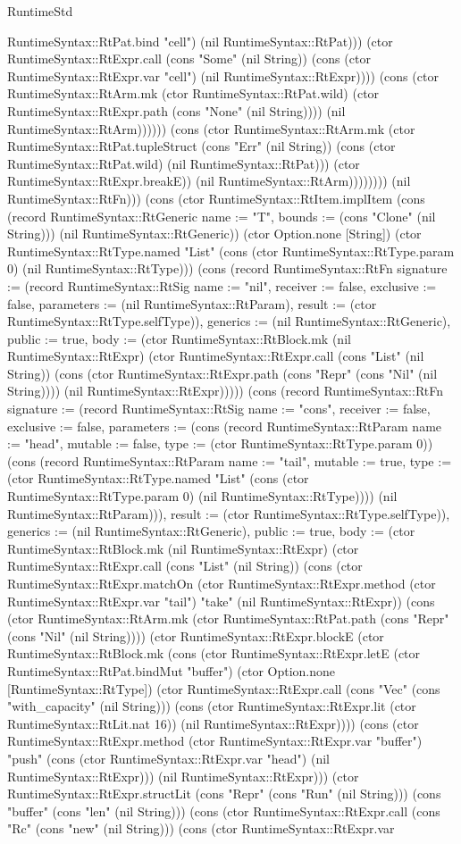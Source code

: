 \begin{lexlean}{RuntimeStd}
\begin{semanticmodule}
{RuntimeSyntax::RtPat.bind "cell") (nil RuntimeSyntax::RtPat))) (ctor RuntimeSyntax::RtExpr.call (cons "Some" (nil String)) (cons (ctor RuntimeSyntax::RtExpr.var "cell") (nil RuntimeSyntax::RtExpr)))) (cons (ctor RuntimeSyntax::RtArm.mk (ctor RuntimeSyntax::RtPat.wild) (ctor RuntimeSyntax::RtExpr.path (cons "None" (nil String)))) (nil RuntimeSyntax::RtArm)))))) (cons (ctor RuntimeSyntax::RtArm.mk (ctor RuntimeSyntax::RtPat.tupleStruct (cons "Err" (nil String)) (cons (ctor RuntimeSyntax::RtPat.wild) (nil RuntimeSyntax::RtPat))) (ctor RuntimeSyntax::RtExpr.breakE)) (nil RuntimeSyntax::RtArm)))))))}) (nil RuntimeSyntax::RtFn))) (cons (ctor RuntimeSyntax::RtItem.implItem (cons (record RuntimeSyntax::RtGeneric {name := "T", bounds := (cons "Clone" (nil String))}) (nil RuntimeSyntax::RtGeneric)) (ctor Option.none [String]) (ctor RuntimeSyntax::RtType.named "List" (cons (ctor RuntimeSyntax::RtType.param 0) (nil RuntimeSyntax::RtType))) (cons (record RuntimeSyntax::RtFn {signature := (record RuntimeSyntax::RtSig {name := "nil", receiver := false, exclusive := false, parameters := (nil RuntimeSyntax::RtParam), result := (ctor RuntimeSyntax::RtType.selfType)}), generics := (nil RuntimeSyntax::RtGeneric), public := true, body := (ctor RuntimeSyntax::RtBlock.mk (nil RuntimeSyntax::RtExpr) (ctor RuntimeSyntax::RtExpr.call (cons "List" (nil String)) (cons (ctor RuntimeSyntax::RtExpr.path (cons "Repr" (cons "Nil" (nil String)))) (nil RuntimeSyntax::RtExpr))))}) (cons (record RuntimeSyntax::RtFn {signature := (record RuntimeSyntax::RtSig {name := "cons", receiver := false, exclusive := false, parameters := (cons (record RuntimeSyntax::RtParam {name := "head", mutable := false, type := (ctor RuntimeSyntax::RtType.param 0)}) (cons (record RuntimeSyntax::RtParam {name := "tail", mutable := true, type := (ctor RuntimeSyntax::RtType.named "List" (cons (ctor RuntimeSyntax::RtType.param 0) (nil RuntimeSyntax::RtType)))}) (nil RuntimeSyntax::RtParam))), result := (ctor RuntimeSyntax::RtType.selfType)}), generics := (nil RuntimeSyntax::RtGeneric), public := true, body := (ctor RuntimeSyntax::RtBlock.mk (nil RuntimeSyntax::RtExpr) (ctor RuntimeSyntax::RtExpr.call (cons "List" (nil String)) (cons (ctor RuntimeSyntax::RtExpr.matchOn (ctor RuntimeSyntax::RtExpr.method (ctor RuntimeSyntax::RtExpr.var "tail") "take" (nil RuntimeSyntax::RtExpr)) (cons (ctor RuntimeSyntax::RtArm.mk (ctor RuntimeSyntax::RtPat.path (cons "Repr" (cons "Nil" (nil String)))) (ctor RuntimeSyntax::RtExpr.blockE (ctor RuntimeSyntax::RtBlock.mk (cons (ctor RuntimeSyntax::RtExpr.letE (ctor RuntimeSyntax::RtPat.bindMut "buffer") (ctor Option.none [RuntimeSyntax::RtType]) (ctor RuntimeSyntax::RtExpr.call (cons "Vec" (cons "with_capacity" (nil String))) (cons (ctor RuntimeSyntax::RtExpr.lit (ctor RuntimeSyntax::RtLit.nat 16)) (nil RuntimeSyntax::RtExpr)))) (cons (ctor RuntimeSyntax::RtExpr.method (ctor RuntimeSyntax::RtExpr.var "buffer") "push" (cons (ctor RuntimeSyntax::RtExpr.var "head") (nil RuntimeSyntax::RtExpr))) (nil RuntimeSyntax::RtExpr))) (ctor RuntimeSyntax::RtExpr.structLit (cons "Repr" (cons "Run" (nil String))) (cons "buffer" (cons "len" (nil String))) (cons (ctor RuntimeSyntax::RtExpr.call (cons "Rc" (cons "new" (nil String))) (cons (ctor RuntimeSyntax::RtExpr.var }
\end{semanticmodule}
\end{lexlean}
